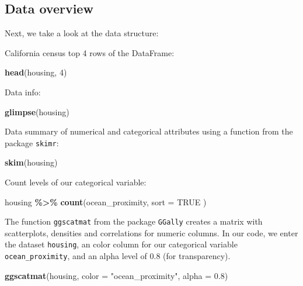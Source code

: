 \documentclass[
]{book}
\newenvironment{Shaded}{\begin{snugshade}}{\end{snugshade}}
\newcommand{\DataTypeTok}[1]{\textcolor[rgb]{0.13,0.29,0.53}{#1}}
\newcommand{\DecValTok}[1]{\textcolor[rgb]{0.00,0.00,0.81}{#1}}
\newcommand{\FloatTok}[1]{\textcolor[rgb]{0.00,0.00,0.81}{#1}}
\newcommand{\KeywordTok}[1]{\textcolor[rgb]{0.13,0.29,0.53}{\textbf{#1}}}
\newcommand{\NormalTok}[1]{#1}
\newcommand{\OperatorTok}[1]{\textcolor[rgb]{0.81,0.36,0.00}{\textbf{#1}}}
\newcommand{\OtherTok}[1]{\textcolor[rgb]{0.56,0.35,0.01}{#1}}
\newcommand{\StringTok}[1]{\textcolor[rgb]{0.31,0.60,0.02}{#1}}
\begin{document}
\hypertarget{data-overview}{%
\subsection{Data overview}\label{data-overview}}

Next, we take a look at the data structure:

California census top 4 rows of the DataFrame:

\begin{Shaded}
\begin{Highlighting}[]
\KeywordTok{head}\NormalTok{(housing, }\DecValTok{4}\NormalTok{)}
\end{Highlighting}
\end{Shaded}

Data info:

\begin{Shaded}
\begin{Highlighting}[]
\KeywordTok{glimpse}\NormalTok{(housing)}
\end{Highlighting}
\end{Shaded}

Data summary of numerical and categorical attributes using a function from the package \texttt{skimr}:

\begin{Shaded}
\begin{Highlighting}[]
\KeywordTok{skim}\NormalTok{(housing)}
\end{Highlighting}
\end{Shaded}

Count levels of our categorical variable:

\begin{Shaded}
\begin{Highlighting}[]
\NormalTok{housing }\OperatorTok{\%\textgreater{}\%}
\StringTok{  }\KeywordTok{count}\NormalTok{(ocean\_proximity,}
    \DataTypeTok{sort =} \OtherTok{TRUE}
\NormalTok{  )}
\end{Highlighting}
\end{Shaded}

The function \texttt{ggscatmat} from the package \texttt{GGally} creates a matrix with scatterplots, densities and correlations for numeric columns. In our code, we enter the dataset \texttt{housing}, an color column for our categorical variable \texttt{ocean\_proximity}, and an alpha level of 0.8 (for transparency).

\begin{Shaded}
\begin{Highlighting}[]
\KeywordTok{ggscatmat}\NormalTok{(housing, }\DataTypeTok{color =} \StringTok{"ocean\_proximity"}\NormalTok{, }\DataTypeTok{alpha =} \FloatTok{0.8}\NormalTok{)}
\end{Highlighting}
\end{Shaded}
\end{document}
